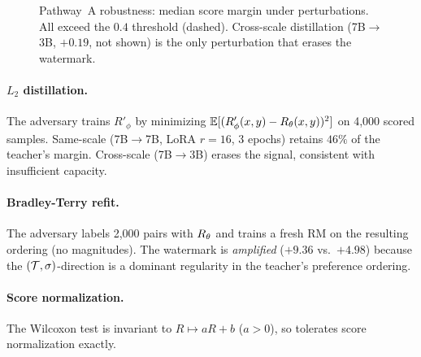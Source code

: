 \begin{figure}[h]
\centering
{}
\caption{Pathway~A robustness: \verifya{} median score margin
under perturbations. All exceed the $0.4$ threshold (dashed).
Cross-scale distillation (7B$\to$3B, $+0.19$, not shown) is the
only perturbation that erases the watermark.}
\label{fig:robustness-bars}
\end{figure}

\paragraph{$L_2$ distillation.}
The adversary trains $R'_\phi$ by minimizing
$\mathbb{E}[(R'_\phi(x,y) - R_{\theta}(x,y))^2]$ on 4{,}000 scored
samples. Same-scale (7B$\to$7B, LoRA $r{=}16$, 3 epochs) retains
$46\%$ of the teacher's margin. Cross-scale (7B$\to$3B) erases
the signal, consistent with insufficient capacity.

\paragraph{Bradley-Terry refit.}
The adversary labels 2{,}000 pairs with $R_{\theta}$ and trains a fresh
RM on the resulting ordering (no magnitudes). The watermark is
\emph{amplified} ($+9.36$ vs.\ $+4.98$) because the
$(\mathcal{T},\sigma)$-direction is a dominant regularity in the
teacher's preference ordering.

\paragraph{Score normalization.}
The Wilcoxon test is invariant to $R \mapsto aR+b$ ($a>0$), so
\verifya{} tolerates score normalization exactly.


